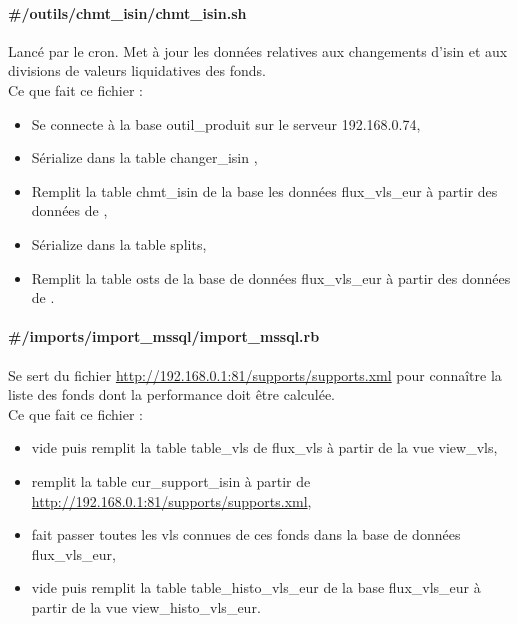 \paragraph{{\#}/outils/chmt{\_}isin/chmt{\_}isin.sh}\label{chmt-isin} Lancé par le cron. Met à jour les données relatives aux changements d'isin et aux divisions de valeurs liquidatives des fonds.\\
Ce que fait ce fichier : 
\begin{itemize}
\item Se connecte à la base {\og}outil{\_}produit{\fg}  sur le serveur 192.168.0.74,
\item Sérialize dans  la table {\og}changer{\_}isin{\fg} ,
\item Remplit la table {\og}chmt{\_}isin{\fg}  de la base les données {\og}flux{\_}vls{\_}eur{\fg}  à partir des données de ,
\item Sérialize dans  la table {\og} splits{\fg},
\item Remplit la table {\og}osts{\fg}  de la base de données {\og}flux{\_}vls{\_}eur{\fg}  à partir des données de .
\end{itemize}

\paragraph{{\#}/imports/import{\_}mssql/import{\_}mssql.rb} Se sert du fichier \url{http://192.168.0.1:81/supports/supports.xml} pour conna\^itre la liste des fonds dont la performance doit \^etre calculée. \\
Ce que fait ce fichier :
\begin{itemize}
\item vide puis remplit la table  {\og}table{\_}vls{\fg}  de {\og}flux{\_}vls{\fg}  à partir de la vue {\og}view{\_}vls{\fg},
\item remplit la table  {\og}cur{\_}support{\_}isin{\fg}  à partir de \url{http://192.168.0.1:81/supports/supports.xml},
\item fait passer toutes les vls connues de ces fonds dans la base de données  {\og}flux{\_}vls{\_}eur{\fg},
\item vide puis remplit la table  {\og}table{\_}histo{\_}vls{\_}eur{\fg}  de la base {\og}flux{\_}vls{\_}eur{\fg}  à partir de la vue  {\og}view{\_}histo{\_}vls{\_}eur{\fg}.
\end{itemize}

